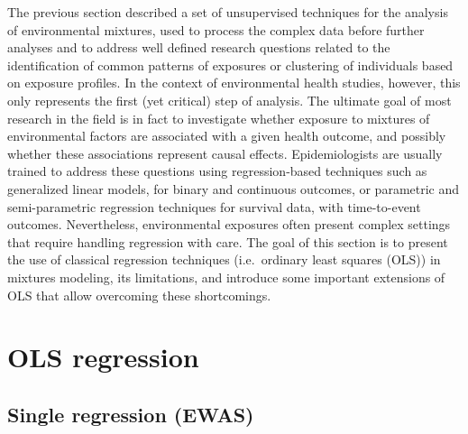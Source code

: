 \documentclass[
]{book}
\begin{document}
The previous section described a set of unsupervised techniques for the analysis of environmental mixtures, used to process the complex data before further analyses and to address well defined research questions related to the identification of common patterns of exposures or clustering of individuals based on exposure profiles. In the context of environmental health studies, however, this only represents the first (yet critical) step of analysis. The ultimate goal of most research in the field is in fact to investigate whether exposure to mixtures of environmental factors are associated with a given health outcome, and possibly whether these associations represent causal effects. Epidemiologists are usually trained to address these questions using regression-based techniques such as generalized linear models, for binary and continuous outcomes, or parametric and semi-parametric regression techniques for survival data, with time-to-event outcomes. Nevertheless, environmental exposures often present complex settings that require handling regression with care. The goal of this section is to present the use of classical regression techniques (i.e.~ordinary least squares (OLS)) in mixtures modeling, its limitations, and introduce some important extensions of OLS that allow overcoming these shortcomings.

\hypertarget{ols-regression}{%
\section{OLS regression}\label{ols-regression}}

\hypertarget{single-regression-ewas}{%
\subsection{Single regression (EWAS)}\label{single-regression-ewas}}
\end{document}
